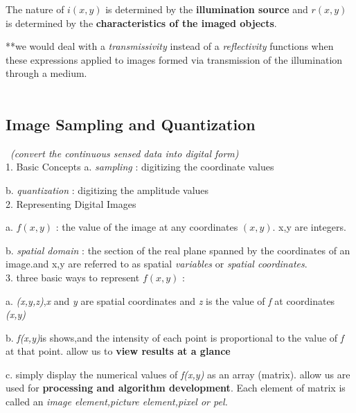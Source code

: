 \documentclass[12pt]{article}
\begin{document}
The nature of \begin{math} i(x,y) \end{math} is determined by the \textbf{illumination source} and \begin{math} r(x,y) \end{math} is determined by the \textbf{characteristics of the imaged objects}.

**we would deal with a \textsl{transmissivity} instead of a \textsl{reflectivity} functions when these expressions applied to images formed via transmission of the illumination through a medium.\\
\\
\subsection{Image Sampling and Quantization}\ \textsl{(convert the continuous sensed data into digital form)}\\
1. Basic Concepts
a. \textsl{sampling} : digitizing the coordinate values 

b. \textsl{quantization} : digitizing the amplitude values
\\
2. Representing Digital Images

a. \begin{math} f(x,y) \end{math} : the value of the image at any coordinates \begin{math} (x,y) \end{math}. x,y are integers.

b. \textsl{spatial domain} : the section of the real plane spanned by the coordinates of an image.\quad and x,y are referred to as spatial \textsl{variables} or \textsl{spatial coordinates}.
\\
3. three basic ways to represent \begin{math} f(x,y) \end{math} : 

a. \textsl{(x,y,z)},\textsl{x} and \textsl{y} are spatial coordinates and \textsl{z} is the value of \textsl{f} at coordinates \textsl{(x,y)}

b. \textsl{f(x,y)}is shows,and the intensity of each point is proportional to the value of \textsl{f} at that point. allow us to \textbf{view results at a glance}

c. simply display the numerical values of \textsl{f(x,y)} as an array (matrix). allow us are used for \textbf{processing and algorithm development}. Each element of matrix is called an \textsl{ image element,picture element,pixel or pel.}
\end{document}

